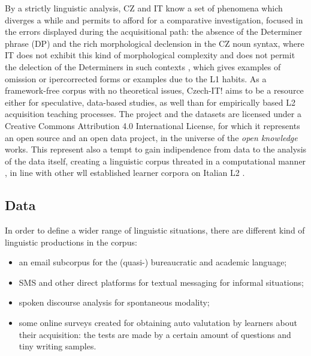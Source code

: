 \documentclass[a4paper,twoside,11pt,chapterprefix=false,bibliography=totocnumbered]{scrbook}
\providecommand{\tightlist}{%
  \setlength{\itemsep}{0pt}\setlength{\parskip}{0pt}}
\theoremstyle{definition}
\theoremstyle{definition}
\theoremstyle{definition}
\theoremstyle{remark}
\begin{document}
By a strictly linguistic analysis, CZ and IT know a set of phenomena
which diverges a while and permits to afford for a comparative
investigation, focused in the errors displayed during the acquisitional
path: the absence of the Determiner phrase (DP) and the rich
morphological declension in the CZ noun syntax, where IT does not
exhibit this kind of morphological complexity and does not permit the
delection of the Determiners in such contexts
\citep[\citet{longobardi-n_movement}]{bianchi1992}, which gives examples
of omission or ipercorrected forms or examples due to the L1 habits. As
a framework-free corpus with no theoretical issues, Czech-IT! aims to be
a resource either for speculative, data-based studies, as well than for
empirically based L2 acquisition teaching processes. The project and the
datasets are licensed under a Creative Commons Attribution 4.0
International License, for which it represents an open source and an
open data project, in the universe of the \emph{open knowledge} works.
This represent also a tempt to gain indipendence from data to the
analysis of the data itself, creating a linguistic corpus threated in a
computational manner \citep[\citet{kuebler-corpus_linguistics},
\citet{schmid-treetagger}, \citet{bird2009},
\citet{kurdi_natural_2016-2}, \citet{clark_handbook_2010-1}]{abney1997},
in line with other wll established learner corpora on Italian L2
\citep[\citet{lips}]{valico}.

\subsection{Data}\label{data}

In order to define a wider range of linguistic situations, there are
different kind of linguistic productions in the corpus:

\begin{itemize}
\tightlist
\item
  an email subcorpus for the (quasi-) bureaucratic and academic
  language;
\item
  SMS and other direct platforms for textual messaging for informal
  situations;
\item
  spoken discourse analysis for spontaneous modality;
\item
  some online surveys created for obtaining auto valutation by learners
  about their acquisition: the tests are made by a certain amount of
  questions and tiny writing samples.
\end{itemize}
\end{document}
